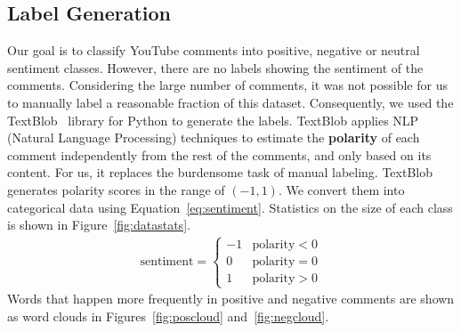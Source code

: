 \subsection{Label Generation}
\label{sec:label}
Our goal is to classify YouTube comments into positive, negative or neutral sentiment classes. However, there are no labels showing the sentiment of the comments. Considering the large number of comments, it was not possible for us to manually label a reasonable fraction of this dataset. Consequently, we used the TextBlob~\cite{textblob} library for Python to generate the labels. TextBlob applies NLP (Natural Language Processing) techniques to estimate the \textbf{polarity} of each comment independently from the rest of the comments, and only based on its content. For us, it replaces the burdensome task of manual labeling. TextBlob generates polarity scores in the range of $(-1,1)$. We convert them into categorical data using Equation~\ref{eq:sentiment}. Statistics on the size of each class is shown in Figure~\ref{fig:datastats}.
\begin{eqnarray}
\textrm{sentiment}=
\begin{cases}
-1 & \textrm{polarity} < 0\\
0 & \textrm{polarity} = 0\\
1 & \textrm{polarity} > 0
\end{cases}
\label{eq:sentiment}
\end{eqnarray}
Words that happen more frequently in positive and negative comments are shown as word clouds in Figures~\ref{fig:poscloud} and~\ref{fig:negcloud}.

